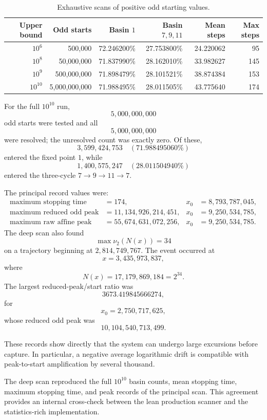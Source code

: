 \documentclass[11pt]{article}
\newcommand{\vTwo}{\nu_2}
\begin{document}
\begin{table}[ht]
\centering
\small
\begin{tabular}{@{}rrrrrr@{}}
\toprule
Upper bound & Odd starts & Basin \(1\) & Basin \(7,9,11\) & Mean steps & Max steps\\
\midrule
\(10^6\) & 500,000 & 72.246200\% & 27.753800\% & 24.220062 & 95\\
\(10^8\) & 50,000,000 & 71.837990\% & 28.162010\% & 33.982627 & 145\\
\(10^9\) & 500,000,000 & 71.898479\% & 28.101521\% & 38.874384 & 153\\
\(10^{10}\) & 5,000,000,000 & 71.988495\% & 28.011505\% & 43.775640 & 174\\
\bottomrule
\end{tabular}
\caption{Exhaustive scans of positive odd starting values.}
\label{tab:summary}
\end{table}

For the full \(10^{10}\) run,
\[
5{,}000{,}000{,}000
\]
odd starts were tested and all
\[
5{,}000{,}000{,}000
\]
were resolved; the unresolved count was exactly zero. Of these,
\[
3{,}599{,}424{,}753
\quad(71.988495060\%)
\]
entered the fixed point \(1\), while
\[
1{,}400{,}575{,}247
\quad(28.011504940\%)
\]
entered the three-cycle \(7\to9\to11\to7\).

The principal record values were:
\begin{align*}
\text{maximum stopping time} &=174,
&x_0&=8{,}793{,}787{,}045,\\
\text{maximum reduced odd peak} &=11{,}134{,}926{,}214{,}451,
&x_0&=9{,}250{,}534{,}785,\\
\text{maximum raw affine peak} &=55{,}674{,}631{,}072{,}256,
&x_0&=9{,}250{,}534{,}785.
\end{align*}
The deep scan also found
\[
\max \vTwo(N(x))=34
\]
on a trajectory beginning at \(2{,}814{,}749{,}767\). The event occurred at
\[
x=3{,}435{,}973{,}837,
\]
where
\[
N(x)=17{,}179{,}869{,}184=2^{34}.
\]
The largest reduced-peak/start ratio was
\[
3673.419845666274,
\]
for
\[
x_0=2{,}750{,}717{,}625,
\]
whose reduced odd peak was
\[
10{,}104{,}540{,}713{,}499.
\]

These records show directly that the system can undergo large excursions before capture. In particular, a negative average logarithmic drift is compatible with peak-to-start amplification by several thousand.

The deep scan reproduced the full \(10^{10}\) basin counts, mean stopping time, maximum stopping time, and peak records of the principal scan. This agreement provides an internal cross-check between the lean production scanner and the statistics-rich implementation.
\end{document}
